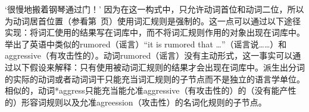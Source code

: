 \begin{exe}
\begin{xlist}[iv.]
\begin{exe}
\begin{xlist}[iv.]
\glt `很慢地搬着钢琴通过门！'
\z
因为在这一构式中，只允许动词首位和动词二位，所以为动词居首位置（参看第~\pageref{lr-verb-movement}页）使用词汇规则是强制的。这一点可以通过以下途径实现：将词汇使用的结果写在词库中，而不将词汇规则作用的对象出现在词库中。\citet[\S~3.4.2, 5.3]{Koenig99a}举出了英语中类似的rumored（谣言）“it is rumored that \ldots”（谣言说……）和aggressive（有攻击性的）。动词rumored（谣言）没有主动形式，这一事实可以通过以下假设来解释：只有使用被动词汇规则的结果才会出现在词库中。派生出分词的实际的动词或者动词词干只能充当词汇规则的子节点而不是独立的语言学单位。相似的，动词*aggress只能充当能允准aggressive（有攻击性的）的（没有能产性的）形容词规则以及允准agreession（攻击性）的名词化规则的子节点。


\end{xlist}
\end{exe}
\end{xlist}
\end{exe}

